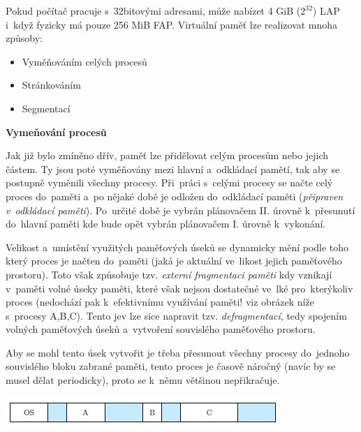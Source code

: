 Pokud počítač pracuje s~32bitovými adresami, může nabízet 4 GiB ($2^{32}$) LAP i~když fyzicky má pouze 256 MiB FAP. Virtuální paměť lze realizovat mnoha způsoby:
\begin{itemize}
	\item Vyměňováním celých procesů
	\item Stránkováním
	\item Segmentací
\end{itemize}

\begin{Large}
	\vspace{0,5cm}
	\textbf{Vymeňování procesů}
\end{Large}

Jak již bylo zmíněno dřív, paměť lze přidělovat celým procesům nebo jejich částem. Ty jsou poté vyměňovány mezi hlavní a~odkládací pamětí, tak aby se postupně vyměnili všechny procesy. Při~práci s~celými procesy se načte celý proces do~paměti a~po nějaké době je odložen do~odkládací paměti (\emph{připraven v~odkládací paměti}). Po~určité době je vybrán plánovačem II. úrovně k~přesunutí do~hlavní paměti kde bude opět vybrán plánovačem I. úrovně k~vykonání. 

\vspace{0,5cm}

Velikost a~umístění využitých paměťových úseků se dynamicky mění podle toho který proces je načten do~paměti (jaká je aktuální ve~likost jejich paměťového prostoru). Toto však způsobuje tzv. \emph{externí fragmentaci paměti} kdy vznikají v~paměti volné úseky paměti, které však nejsou dostatečné ve~lké pro~kterýkoliv proces (nedochází pak k~efektivnímu využívání paměti! viz obrázek níže s~procesy A,B,C). Tento jev lze sice napravit tzv. \emph{defragmentací}, tedy spojením volných paměťových úseků a~vytvoření souvislého paměťového prostoru.

\clearpage

Aby se mohl tento úsek vytvořit je třeba přesunout všechny procesy do~jednoho souvislého bloku zabrané paměti, tento proces je časově náročný (navíc by se musel dělat periodicky), proto se k~němu většinou nepřikračuje. 

\begin{center}
	\includegraphics[scale=1]{images/mem_fragmentace.png}
\end{center}

